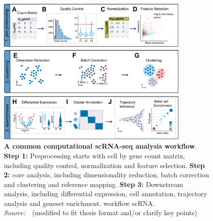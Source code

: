 \begin{figure}[!ht]
	\centering
	\includegraphics[width=0.85\textwidth]{workflow_scRNA/fig}
	\vspace{0.1cm}
	\caption[A common computational scRNA-seq analysis workflow]{
		\textbf{A common computational scRNA-seq analysis workflow}.
		\textbf{Step 1:} Preprocessing starts with cell by gene count matrix, including quality control, normalization and feature selection.
		\textbf{Step 2:} core analysis, including dimensionality reduction, batch correction and clustering and reference mapping.
		\textbf{Step 3:} Downstream analysis, including differential expression, cell annotation, trajectory analysis and geneset enrichment.
	workflow scRNA. \emph{Source:~\cite{heumos2023best}}~(modified to fit thesis format and/or clarify key points)}
	\label{fig:workflow_scRNA}
\end{figure}

